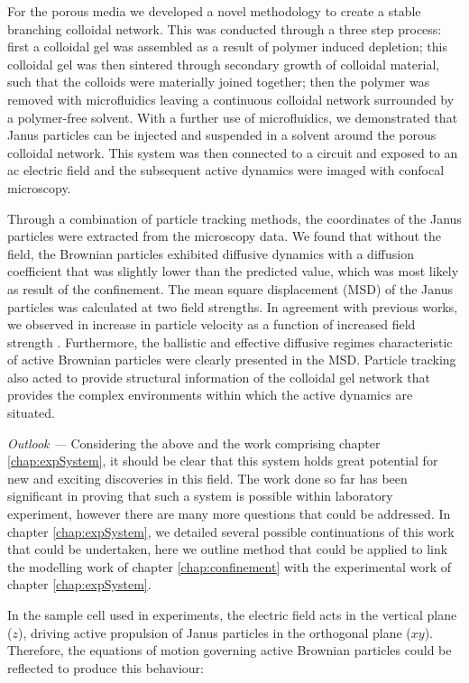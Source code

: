 For the porous media we developed a novel methodology to create a stable branching colloidal network. This was conducted through a three step process: first a colloidal gel was assembled as a result of polymer induced depletion; this colloidal gel was then sintered through secondary growth of colloidal material, such that the colloids were materially joined together; then the polymer was removed with microfluidics leaving a continuous colloidal network surrounded by a polymer-free solvent.
With a further use of microfluidics, we demonstrated that Janus particles can be injected and suspended in a solvent around the porous colloidal network. This system was then connected to a circuit and exposed to an ac electric field and the subsequent active dynamics were imaged with confocal microscopy. 

Through a combination of particle tracking methods, the coordinates of the Janus particles were extracted from the microscopy data. We found that without the field, the Brownian particles exhibited diffusive dynamics with a diffusion coefficient that was slightly lower than the predicted value, which was most likely as result of the confinement. 
The mean square displacement (MSD) of the Janus particles was calculated at two field strengths. In agreement with previous works, we observed in increase in particle velocity as a function of increased field strength \cite{gangwal2008,sakai2020}. Furthermore, the ballistic and effective diffusive regimes characteristic of active Brownian particles were clearly presented in the MSD. Particle tracking also acted to provide structural information of the colloidal gel network that provides the complex environments within which the active dynamics are situated.


\textit{Outlook ---} Considering the above and the work comprising chapter \ref{chap:expSystem}, it  should be clear that this system holds great potential for new and exciting discoveries in this field. The work done so far has been significant in proving that such a system is possible within laboratory experiment, however there are many more questions that could be addressed. In chapter \ref{chap:expSystem}, we detailed several possible continuations of this work that could be undertaken, here we outline method that could be applied to link the modelling work of chapter  \ref{chap:confinement} with the experimental work of chapter \ref{chap:expSystem}.

In the sample cell used in experiments, the electric field acts in the vertical plane ($z$), driving active propulsion of Janus particles in the orthogonal plane ($xy$). Therefore, the equations of motion governing active Brownian particles could be reflected to produce this behaviour:

